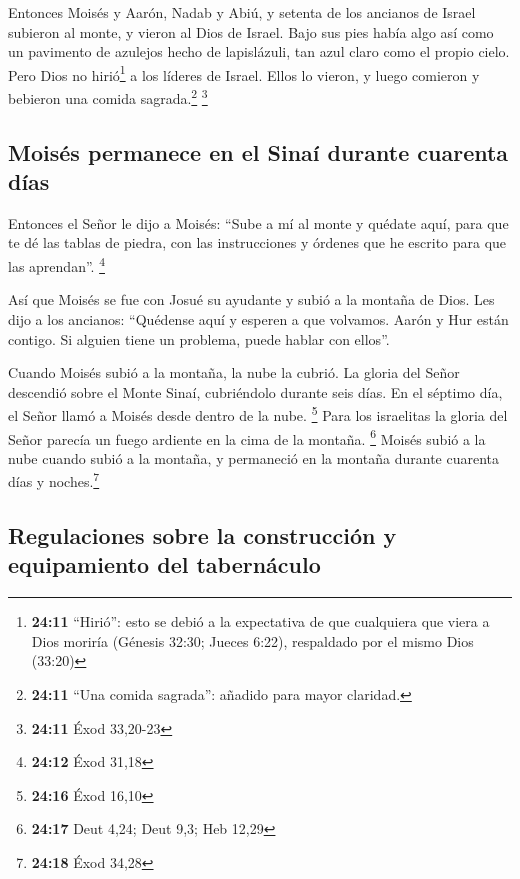  Entonces Moisés y Aarón, Nadab y Abiú, y setenta de los
ancianos de Israel subieron al monte,  y vieron al Dios
de Israel. Bajo sus pies había algo así como un pavimento de azulejos
hecho de lapislázuli, tan azul claro como el propio cielo.
 Pero Dios no hirió\footnote{\textbf{24:11} ``Hirió'':
  esto se debió a la expectativa de que cualquiera que viera a Dios
  moriría (Génesis 32:30; Jueces 6:22), respaldado por el mismo Dios
  (33:20)} a los líderes de Israel. Ellos lo vieron, y luego comieron y
bebieron una comida sagrada.\footnote{\textbf{24:11} ``Una comida
  sagrada'': añadido para mayor claridad.} \footnote{\textbf{24:11} Éxod
  33,20-23}

\hypertarget{moisuxe9s-permanece-en-el-sinauxed-durante-cuarenta-duxedas}{%
\subsection{Moisés permanece en el Sinaí durante cuarenta
días}\label{moisuxe9s-permanece-en-el-sinauxed-durante-cuarenta-duxedas}}

 Entonces el Señor le dijo a Moisés: ``Sube a mí al monte
y quédate aquí, para que te dé las tablas de piedra, con las
instrucciones y órdenes que he escrito para que las aprendan''.
\footnote{\textbf{24:12} Éxod 31,18}

 Así que Moisés se fue con Josué su ayudante y subió a la
montaña de Dios.  Les dijo a los ancianos: ``Quédense
aquí y esperen a que volvamos. Aarón y Hur están contigo. Si alguien
tiene un problema, puede hablar con ellos''.

 Cuando Moisés subió a la montaña, la nube la cubrió.
 La gloria del Señor descendió sobre el Monte Sinaí,
cubriéndolo durante seis días. En el séptimo día, el Señor llamó a
Moisés desde dentro de la nube. \footnote{\textbf{24:16} Éxod 16,10}
 Para los israelitas la gloria del Señor parecía un fuego
ardiente en la cima de la montaña. \footnote{\textbf{24:17} Deut 4,24;
  Deut 9,3; Heb 12,29}  Moisés subió a la nube cuando
subió a la montaña, y permaneció en la montaña durante cuarenta días y
noches.\footnote{\textbf{24:18} Éxod 34,28}

\hypertarget{regulaciones-sobre-la-construcciuxf3n-y-equipamiento-del-tabernuxe1culo}{%
\subsection{Regulaciones sobre la construcción y equipamiento del
tabernáculo}\label{regulaciones-sobre-la-construcciuxf3n-y-equipamiento-del-tabernuxe1culo}}

